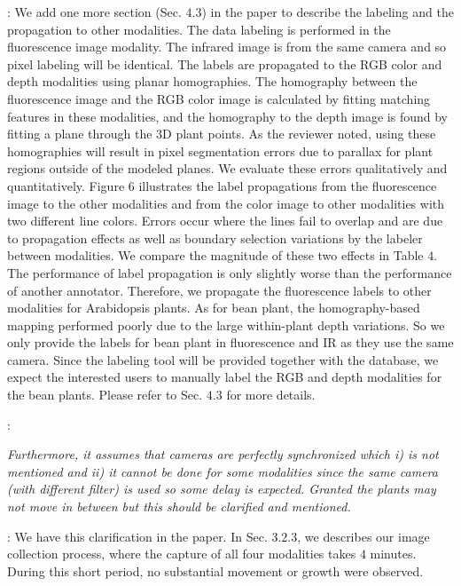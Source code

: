 \documentclass[11pt,letterpaper]{article}
\newcounter{reviewcounter}
\newenvironment{review}
{\noindent {\bf Comment~\arabic{reviewcounter}}:\addtocounter{reviewcounter}{1}\itshape}
{\vspace{0.8em}}
\newenvironment{response}
{\noindent {\bf Response}: \color{black}}
{\color{black} \vspace{1.6em}}
\begin{document}
\begin{response}
We add one more section (Sec. $4.3$) in the paper to describe the labeling and the propagation to other modalities.
The data labeling is performed in the fluorescence image modality.
The infrared image is from the same camera and so pixel labeling will be identical.
The labels are propagated to the RGB color and depth modalities using planar homographies.
The homography between the fluorescence image and the RGB color image is calculated by fitting matching features in these modalities, and the homography to the depth image is found by fitting a plane through the $3$D plant points.
As the reviewer noted, using these homographies will result in pixel segmentation errors due to parallax for plant regions outside of the modeled planes.
We evaluate these errors qualitatively and quantitatively.
Figure $6$ illustrates the label propagations from the fluorescence image to the other modalities and from the color image to other modalities with two different line colors.
Errors occur where the lines fail to overlap and are due to propagation effects as well as boundary selection variations by the labeler between modalities.
We compare the magnitude of these two effects in Table $4$.
The performance of label propagation is only slightly worse than the performance of another annotator.
Therefore, we propagate the fluorescence labels to other modalities for Arabidopsis plants.
As for bean plant, the homography-based mapping performed poorly due to the large within-plant depth variations.
So we only provide the labels for bean plant in fluorescence and IR as they use the same camera.
Since the labeling tool will be provided together with the database, we expect the interested users to manually label the RGB and depth modalities for the bean plants.
Please refer to Sec. $4.3$ for more details.
\end{response}


\begin{review}
Furthermore, it assumes that cameras are perfectly synchronized which i) is not mentioned and ii) it cannot be done for some modalities since the same camera (with different filter) is used so some delay is expected.
Granted the plants may not move in between but this should be clarified and mentioned.
\end{review}

\begin{response}
We have this clarification in the paper.
In Sec. $3.2.3$, we describes our image collection process, where the capture of all four modalities takes $4$ minutes.
During this short period, no substantial movement or growth were observed.
\end{response}
\end{document}
